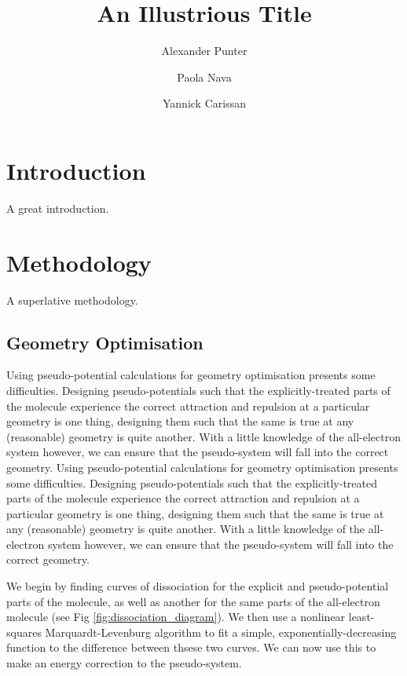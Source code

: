 \documentclass[aip,reprint]{revtex4-1}
\begin{document}
\title{An Illustrious Title}
\author{Alexander Punter}
\author{Paola Nava}
\author{Yannick Carissan}

\maketitle

\section{Introduction}

A great introduction.

\section{Methodology}

A superlative methodology.

\subsection*{\sffamily \large Geometry Optimisation}
\label{section:geometry_optimisation}		    		  
  Using pseudo-potential calculations for geometry optimisation presents some difficulties. Designing pseudo-potentials such that the explicitly-treated parts of the molecule experience the correct attraction and repulsion at a particular geometry is one thing, designing them such that the same is true at any (reasonable) geometry is quite another. With a little knowledge of the all-electron system however, we can ensure that the pseudo-system will fall into the correct geometry.		  Using pseudo-potential calculations for geometry optimisation presents some difficulties. Designing pseudo-potentials such that the explicitly-treated parts of the molecule experience the correct attraction and repulsion at a particular geometry is one thing, designing them such that the same is true at any (reasonable) geometry is quite another. With a little knowledge of the all-electron system however, we can ensure that the pseudo-system will fall into the correct geometry.
 		 
 We begin by finding curves of dissociation for the explicit and pseudo-potential parts of the molecule, as well as another for the same parts of the all-electron molecule (see Fig \ref{fig:dissociation_diagram}). We then use a nonlinear least-squares Marquardt-Levenburg algorithm to fit a simple, exponentially-decreasing function to the difference between thsese two curves. We can now use this to make an energy correction to the pseudo-system. 		 
  		  
\end{document}
